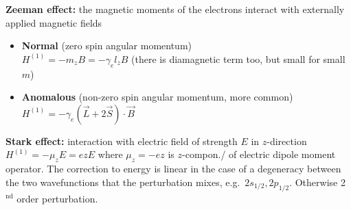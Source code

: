 \begin{squishlist}
    \item \textbf{Zeeman effect:} the magnetic moments of the electrons interact with externally applied magnetic fields
    \begin{itemize}
        \item \textbf{Normal} (zero spin angular momentum) \\
        $H^{(1)} = - m_z B = -\gamma_e l_z B$ (there is diamagnetic term too, but small for small $m$)
        \item \textbf{Anomalous} (non-zero spin angular momentum, more common) \\
        $H^{(1)} = -\gamma_e (\vec{L} + 2\vec{S}) \cdot \vec{B}$
    \end{itemize}

    \item \textbf{Stark effect:} interaction with electric field of strength $E$ in $z$-direction \\
    $H^{(1)} = - \mu_z E = e z E$ where $\mu_z = -e z$ is $z$-compon./ of electric dipole moment operator.
    The correction to energy is linear in the case of a degeneracy between the two wavefunctions that the perturbation mixes, e.g.\ $2s_{1/2}, 2p_{1/2}$. Otherwise 2$^{\text{nd}}$ order perturbation.
\end{squishlist}


